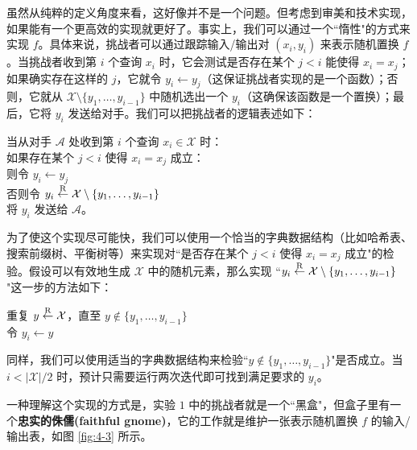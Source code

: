 虽然从纯粹的定义角度来看，这好像并不是一个问题。但考虑到审美和技术实现，如果能有一个更高效的实现就更好了。事实上，我们可以通过一个``惰性"的方式来实现 $f$。具体来说，挑战者可以通过跟踪输入/输出对 $(x_i,y_i)$ 来表示随机置换 $f$。当挑战者收到第 $i$ 个查询 $x_i$ 时，它会测试是否存在某个 $j<i$ 能使得 $x_i=x_j$；如果确实存在这样的 $j$，它就令 $y_i\leftarrow y_j$（这保证挑战者实现的是一个函数）；否则，它就从 $\mathcal{X}\setminus\{y_1,\dots,y_{i-1}\}$ 中随机选出一个 $y_i$（这确保该函数是一个置换）；最后，它将 $y_i$ 发送给对手。我们可以把挑战者的逻辑表述如下：

\vspace*{10pt}

\hspace*{5pt} 当从对手 $\mathcal{A}$ 处收到第 $i$ 个查询 $x_i\in\mathcal{X}$ 时：\\
\hspace*{50pt} 如果存在某个 $j<i$ 使得 $x_i=x_j$ 成立：\\
\hspace*{75pt} 则令 $y_i\leftarrow y_j$\\
\hspace*{75pt} 否则令 $y_i\overset{\rm R}\leftarrow\mathcal{X}\setminus\{y_1,\dots,y_{i-1}\}$\\
\hspace*{50pt} 将 $y_i$ 发送给 $\mathcal{A}$。

\vspace*{10pt}

\noindent
为了使这个实现尽可能快，我们可以使用一个恰当的字典数据结构（比如哈希表、搜索前缀树、平衡树等）来实现对``是否存在某个 $j<i$ 使得 $x_i=x_j$ 成立"的检验。假设可以有效地生成 $\mathcal{X}$ 中的随机元素，那么实现 ``$y_i\overset{\rm R}\leftarrow\mathcal{X}\setminus\{y_1,\dots,y_{i-1}\}$"这一步的方法如下：

\vspace*{10pt}

\hspace*{5pt} 重复 $y\overset{\rm R}\leftarrow\mathcal{X}$，直至 $y\notin\{y_1,\dots,y_{i-1}\}$\\
\hspace*{26pt} 令 $y_i\leftarrow y$

\vspace*{10pt}

\noindent
同样，我们可以使用适当的字典数据结构来检验``$y\notin\{y_1,\dots,y_{i-1}\}$"是否成立。当 $i<{|\mathcal{X}|}/{2}$ 时，预计只需要运行两次迭代即可找到满足要求的 $y_i$。

一种理解这个实现的方式是，实验 $1$ 中的挑战者就是一个``黑盒"，但盒子里有一个\textbf{忠实的侏儒(faithful gnome)}，它的工作就是维护一张表示随机置换 $f$ 的输入/输出表，如图 \ref{fig:4-3} 所示。

